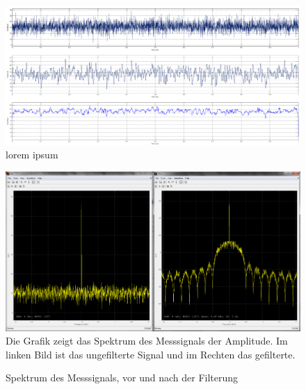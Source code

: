 \begin{figure} [h]
         \centering
         \caption{ lorem ipsum }
         \label{fig:1}
         \centering
         \includegraphics[width=.8\textwidth]{common/img/AmpGefiltert_small.png}

\end{figure}
\vspace{.5cm}
\begin{figure} [h]
         \centering
         \caption{ Spektrum des Messsignals, vor und nach der Filterung  }
         \label{fig:2}
	     \centering
	     \includegraphics[width=.6\textwidth]{common/img/SpektrumAmp.PNG} \\
\vspace{.2cm}
Die Grafik zeigt das Spektrum des Messsignals der Amplitude. Im linken Bild ist das ungefilterte Signal und im Rechten das gefilterte.
%
\end{figure}
\vspace{.5cm}
